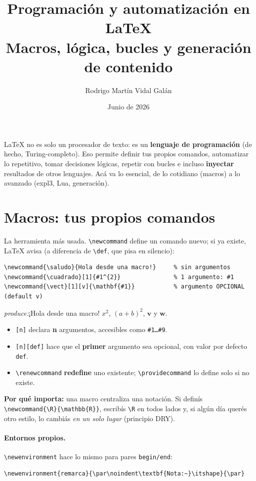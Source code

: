 \documentclass[11pt,a4paper]{article}
\title{\textbf{Programación y automatización en \LaTeX}\\[2pt]
       \large Macros, lógica, bucles y generación de contenido}
\author{Rodrigo Martín Vidal Galán}
\date{Junio de 2026}
\newcommand{\C}[1]{\texttt{\textbackslash #1}}
\newcommand{\pkg}[1]{\textsf{#1}}
\newcommand{\produce}{\par\smallskip\noindent\textit{produce:}\quad}
\newcommand{\saludo}{¡Hola desde una macro!}
\newcommand{\cuadrado}[1]{#1^{2}}
\newcommand{\vect}[1][v]{\mathbf{#1}}      %
\begin{document}
\maketitle

\noindent \LaTeX{} no es solo un procesador de texto: es un \textbf{lenguaje de
programación} (de hecho, Turing-completo). Eso permite definir tus propios
comandos, automatizar lo repetitivo, tomar decisiones lógicas, repetir con
bucles e incluso \textbf{inyectar} resultados de otros lenguajes. Acá va lo
esencial, de lo cotidiano (macros) a lo avanzado (\pkg{expl3}, Lua, generación).

\newpage
\tableofcontents
\newpage

\section{Macros: tus propios comandos}
La herramienta más usada. \C{newcommand} define un comando nuevo; si ya existe,
\LaTeX{} avisa (a diferencia de \C{def}, que pisa en silencio):
\begin{lstlisting}
\newcommand{\saludo}{Hola desde una macro!}     % sin argumentos
\newcommand{\cuadrado}[1]{#1^{2}}               % 1 argumento: #1
\newcommand{\vect}[1][v]{\mathbf{#1}}           % argumento OPCIONAL (default v)
\end{lstlisting}
\produce \saludo{} \quad $\cuadrado{x}$, \quad $\cuadrado{(a+b)}$, \quad
$\vect$ y $\vect[w]$.
\medskip

\begin{itemize}[noitemsep,leftmargin=*]
  \item \texttt{[n]} declara \textbf{n} argumentos, accesibles como
        \texttt{\#1\dots\#9}.
  \item \texttt{[n][def]} hace que el \textbf{primer} argumento sea opcional, con
        valor por defecto \texttt{def}.
  \item \C{renewcommand} \textbf{redefine} uno existente; \C{providecommand} lo
        define solo si no existe.
\end{itemize}
\textbf{Por qué importa:} una macro centraliza una notación. Si definís
\C{newcommand\{\textbackslash R\}\{\textbackslash mathbb\{R\}\}}, escribís
\C{R} en todos lados y, si algún día querés otro estilo, lo cambiás \emph{en un
solo lugar} (principio DRY).

\paragraph{Entornos propios.} \C{newenvironment} hace lo mismo para pares
\texttt{begin/end}:
\begin{lstlisting}
\newenvironment{remarca}{\par\noindent\textbf{Nota:~}\itshape}{\par}
\end{lstlisting}
\end{document}

